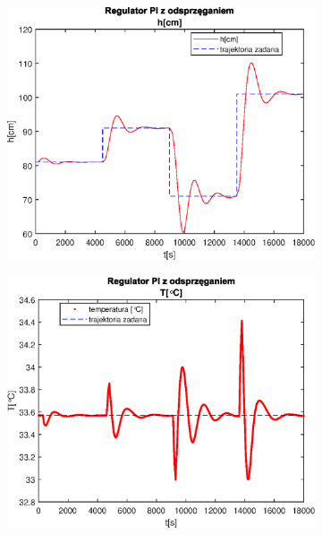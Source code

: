 \begin{figure}[h!]
   \centering
   \begin{subfigure}[b]{0.4\textwidth}
      \includegraphics[width=1\linewidth]{img/PI/decoupler/noDisturbance/PIDecouplerH2Lintrue.eps}
      \caption{}
      \label{fig:fig:PIDecoupler2Lintrue1}
   \end{subfigure}
       
   \begin{subfigure}[b]{0.4\textwidth}
      \includegraphics[width=1\linewidth]{img/PI/decoupler/noDisturbance/PIDecouplerT2Lintrue.eps}
      \caption{}
      \label{fig:fig:PIDecoupler2Lintrue2}
   \end{subfigure}
       

\end{figure}
